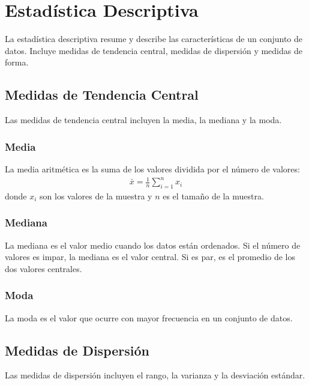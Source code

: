 \documentclass[a4paper]{report} %
\begin{document}
\section{Estad\'istica Descriptiva}

La estad\'istica descriptiva resume y describe las caracter\'isticas de un conjunto de datos. Incluye medidas de tendencia central, medidas de dispersi\'on y medidas de forma.
\subsection{Medidas de Tendencia Central}
Las medidas de tendencia central incluyen la media, la mediana y la moda.
\subsubsection{Media}
La media aritm\'etica es la suma de los valores dividida por el n\'umero de valores:
\begin{eqnarray*}
\bar{x} = \frac{1}{n} \sum_{i=1}^{n} x_i
\end{eqnarray*}
donde $x_i$ son los valores de la muestra y $n$ es el tama\~no de la muestra.
\subsubsection{Mediana}
La mediana es el valor medio cuando los datos est\'an ordenados. Si el n\'umero de valores es impar, la mediana es el valor central. Si es par, es el promedio de los dos valores centrales.
\subsubsection{Moda}
La moda es el valor que ocurre con mayor frecuencia en un conjunto de datos.
\subsection{Medidas de Dispersi\'on}
Las medidas de dispersi\'on incluyen el rango, la varianza y la desviaci\'on est\'andar.
\end{document}
